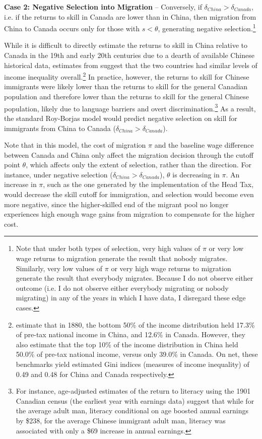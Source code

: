 \textbf{Case 2: Negative Selection into Migration} -- Conversely, if $\delta_{China} > \delta_{Canada}$, i.e. if the returns to skill in Canada are lower than in China, then migration from China to Canada occurs only for those with $s < \theta$, generating negative selection.\footnote{Note that under both types of selection, very high values of $\pi$ or very low wage returns to migration generate the result that nobody migrates. Similarly, very low values of $\pi$ or very high wage returns to migration generate the result that everybody migrates. Because I do not observe either outcome (i.e. I do not observe either everybody migrating or nobody migrating) in any of the years in which I have data, I disregard these edge cases.}

While it is difficult to directly estimate the returns to skill in China relative to Canada in the 19th and early 20th centuries due to a dearth of available Chinese historical data, estimates from \citet{chancelpiketty2021} suggest that the two countries had similar levels of income inequality overall.\footnote{\citet{chancelpiketty2021} estimate that in 1880, the bottom 50\% of the income distribution held 17.3\% of pre-tax national income in China, and 12.6\% in Canada. However, they also estimate that the top 10\% of the income distribution in China held 50.0\% of pre-tax national income, versus only 39.0\% in Canada. On net, these benchmarks yield estimated Gini indices (measures of income inequality) of 0.49 and 0.48 for China and Canada respectively.}
In practice, however, the returns to skill for Chinese immigrants were likely lower than the returns to skill for the general Canadian population and therefore lower than the returns to skill for the general Chinese population, likely due to language barriers and overt discrimination.\footnote{For instance, age-adjusted estimates of the return to literacy using the 1901 Canadian census (the earliest year with earnings data) suggest that while for the average adult man, literacy conditional on age boosted annual earnings by \$238, for the average Chinese immigrant adult man, literacy was associated with only a \$69 increase in annual earnings.} As a result, the standard Roy-Borjas model would predict negative selection on skill for immigrants from China to Canada ($\delta_{China} > \delta_{Canada}$).

Note that in this model, the cost of migration $\pi$ and the baseline wage difference between Canada and China only affect the migration decision through the cutoff point $\theta$, which affects only the extent of selection, rather than the direction. For instance, under negative selection ($\delta_{China} > \delta_{Canada}$), $\theta$ is decreasing in $\pi$. An increase in $\pi$, such as the one generated by the implementation of the Head Tax, would decrease the skill cutoff for immigration, and selection would become even more negative, since the higher-skilled end of the migrant pool no longer experiences high enough wage gains from migration to compensate for the higher cost.


